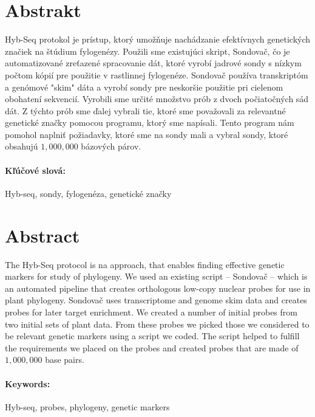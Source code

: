 \documentclass[12pt, oneside]{book}
\begin{document}

\newpage 
\section*{Abstrakt}

Hyb-Seq protokol je prístup, ktorý umožňuje nachádzanie efektívnych genetických značiek na štúdium 
fylogenézy. Použili sme existujúci skript, Sondovač, čo je automatizované zreťazené spracovanie dát, ktoré 
vyrobí jadrové sondy s nízkym počtom kópií pre použitie v rastlinnej fylogenéze. Sondovač používa transkriptóm a genómové "skim" 
dáta a vyrobí sondy pre neskoršie použitie pri cielenom obohatení sekvencií. Vyrobili sme určité množstvo prób z dvoch počiatočných 
sád dát. Z týchto prób sme ďalej vybrali tie, ktoré sme považovali za relevantné genetické značky pomocou programu, ktorý sme napísali. 
Tento program nám pomohol naplniť požiadavky, ktoré sme na sondy mali a vybral sondy, ktoré obsahujú $1,000,000$ bázových párov. 
\paragraph*{Kľúčové slová:} Hyb-seq, sondy, fylogenéza, genetické značky 


\newpage 
\section*{Abstract}

The Hyb-Seq protocol is na approach, that enables finding effective genetic markers for study of phylogeny. 
We used an existing script -- Sondovač -- which is an automated pipeline that creates orthologous low-copy 
nuclear probes for use in plant phylogeny. Sondovač uses transcriptome and genome skim data and creates probes 
for later target enrichment. 
We created a number of initial probes from two initial sets of plant data. From these probes we picked those we 
considered to be relevant genetic markers using a script we coded. The script helped to fulfill the 
requirements we placed on the probes and created probes that are made of $1,000,000$ base pairs. 


\paragraph*{Keywords:} Hyb-seq, probes, phylogeny, genetic markers
\end{document}
